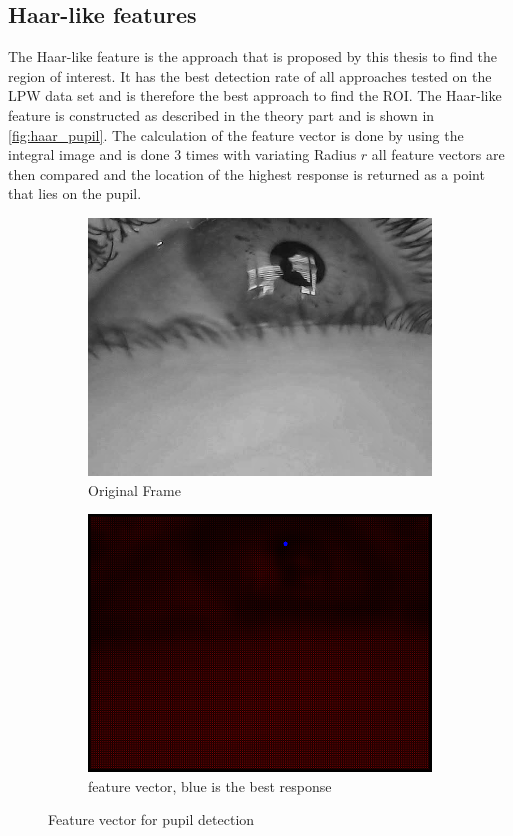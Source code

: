 \subsection{Haar-like features}
The Haar-like feature is the approach that is proposed by this thesis to find the region of interest. It has the best detection rate of all approaches tested on the LPW data set and is therefore the best approach to find the ROI. The Haar-like feature is constructed as described in the theory part and is shown in \ref{fig:haar_pupil}. 
The calculation of the feature vector is done by using the integral image and is done 3 times with variating Radius $r$ all feature vectors are then compared and the location of the highest response is returned as a point that lies on the pupil. 

\begin{figure}[h]
    \centering
    \begin{subfigure}{0.5\textwidth}
        \centering
        \includegraphics[width=0.9\linewidth]{plots/results/originalbest.png}
        \caption{Original Frame}
    \end{subfigure}%
    \hfill
    \begin{subfigure}{0.5\textwidth}
        \centering
        \includegraphics[width=0.9\linewidth]{plots/results/responsehaarbest.png}
        \caption{feature vector, blue is the best response}
    \end{subfigure}%
 
    \caption{Feature vector for pupil detection}
    \label{fig:limit_haar}
\end{figure}

